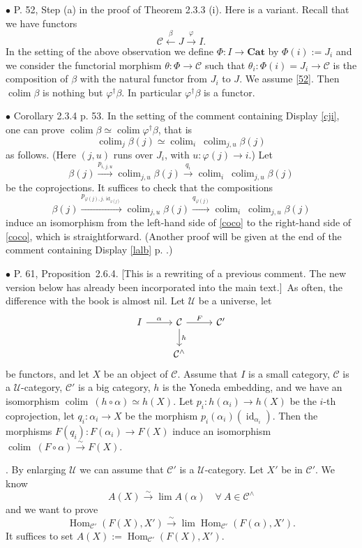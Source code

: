 \documentclass[12pt]{article}
\newcommand{\bu}{\bullet}
\newcommand{\n}{\noindent}
\newcommand{\C}{\mathcal C}
\newcommand{\U}{\mathcal U}
\newcommand{\Cat}{\textbf{Cat}}
\newcommand{\p}{\varphi}
\newcommand{\be}{\begin{equation}}
\newcommand{\ee}{\end{equation}}
\newcommand{\pr}{Proposition}
\newcommand{\rw}{[This is a rewriting of a previous comment. The new version below has already been incorporated into the main text.]}
\DeclareMathOperator*{\co}{colim}
\DeclareMathOperator{\id}{id}
\DeclareMathOperator{\h}{Hom}
\begin{document}

\n$\bu$ P. 52, Step (a) in the proof of Theorem 2.3.3 (i). Here is a variant. Recall that we have functors 
% 
\be\label{cji} 
\C\xleftarrow\beta J\xrightarrow\p I. 
\ee 
% 
In the setting of the above observation we define $\Phi:I\to\Cat$ by $\Phi(i):=J_i$ and we consider the functorial morphism $\theta:\Phi\to\C$ such that $\theta_i:\Phi(i)=J_i\to\C$ is the composition of $\beta$ with the natural functor from $J_i$ to $J$. We assume \eqref{52}. Then $\co\beta$ is nothing but $\p^\dagger\beta$. In particular $\p^\dagger\beta$ is a functor. 

\n$\bu$ Corollary 2.3.4 p. 53. In the setting of the comment containing Display \eqref{cji}, one can prove $\co\beta\simeq\co\p^\dagger\beta$, that is 
%
\be\label{coco} 
\co_j\beta(j)\simeq\co_i\ \co_{j,u}\beta(j) 
\ee 
% 
as follows. (Here $(j,u)$ runs over $J_i$, with $u:\p(j)\to i$.) Let 
$$ 
\beta(j)\xrightarrow{p_{i,j,u}}\co_{j,u}\beta(j)\xrightarrow{q_i}\co_i\ \co_{j,u}\beta(j)
$$ 
be the coprojections. It suffices to check that the compositions 
$$
\beta(j)\xrightarrow{p_{\p(j),j,\id_{\p(j)}}}\co_{j,u}\beta(j)\xrightarrow{q_{\p(j)}}\co_i\ \co_{j,u}\beta(j)
$$ 
induce an isomorphism from the left-hand side of \eqref{coco} to the right-hand side of \eqref{coco}, which is straightforward. (Another proof will be given at the end of the comment containing Display \eqref{lalb} p. \pageref{lalb}.) 


\n$\bu$ P. 61, \pr\ 2.6.4. \rw\ As often, the difference with the book is almost nil. Let $\U$ be a universe, let  
$$
\begin{tikzcd}
I\ar{r}{\alpha}&\C\ar{d}{h}\ar{r}{F}&\C'\\
&\C^\wedge
\end{tikzcd}
$$
be functors, and let $X$ be an object of $\C$. Assume that $I$ is a small category, $\C$ is a $\U$-category, $\C'$ is a big category, $h$ is the Yoneda embedding, and we have an isomorphism $\co\ (h\circ\alpha)\simeq h(X)$. Let $p_i:h(\alpha_i)\to h(X)$ be the $i$-th coprojection, let $q_i:\alpha_i\to X$ be the morphism $p_i(\alpha_i)(\id_{\alpha_i})$. Then the morphisms $F(q_i):F(\alpha_i)\to F(X)$ induce an isomorphism $\co\ (F\circ\alpha)\xrightarrow\sim F(X)$. 

\n{\em Proof}. By enlarging $\U$ we can assume that $\C'$ is a $\U$-category. Let $X'$ be in $\C'$. We know 
$$
A(X)\xrightarrow\sim\lim A(\alpha)\quad\forall\ A\in\C^\wedge 
$$ 
and we want to prove 
$$
\h_{\C'}(F(X),X')\xrightarrow\sim\lim\h_{\C'}(F(\alpha),X'). 
$$ 
It suffices to set $A(X):=\h_{\C'}(F(X),X')$. 
\end{document}
